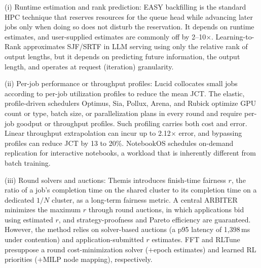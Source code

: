 \documentclass{ieeetj}
\begin{document}
(i) Runtime estimation and rank prediction: EASY backfilling\cite{mualem2001backfilling} is the standard HPC technique that reserves resources for the queue head while advancing later jobs only when doing so does not disturb the reservation. It depends on runtime estimates, and user-supplied estimates are commonly off by 2–10$\times$. Learning-to-Rank\cite{fu2024efficient} approximates SJF/SRTF in LLM serving using only the relative rank of output lengths, but it depends on predicting future information, the output length, and operates at request (iteration) granularity.

(ii) Per-job performance or throughput profiles: Lucid\cite{b5} collocates small jobs according to per-job utilization profiles to reduce the mean JCT. The elastic, profile-driven schedulers Optimus\cite{peng2018optimus}, Sia\cite{b4}, Pollux\cite{qiao2021pollux}, Arena\cite{arena2026}, and Rubick\cite{rubick2025} optimize GPU count or type, batch size, or parallelization plans in every round and require per-job goodput or throughput profiles. Such profiling carries both cost and error. Linear throughput extrapolation can incur up to 2.12$\times$ error, and bypassing profiles can reduce JCT by 13 to 20\%\cite{schedmate2025}. NotebookOS\cite{notebookos2026} schedules on-demand replication for interactive notebooks, a workload that is inherently different from batch training.

(iii) Round solvers and auctions: Themis\cite{mahajan2020themis} introduces finish-time fairness $r$, the ratio of a job's completion time on the shared cluster to its completion time on a dedicated $1/N$ cluster, as a long-term fairness metric. A central ARBITER minimizes the maximum $r$ through round auctions, in which applications bid using estimated $r$, and strategy-proofness and Pareto efficiency are guaranteed. However, the method relies on solver-based auctions (a p95 latency of 1,398\,ms under contention) and application-submitted $r$ estimates. FFT\cite{fft2025} and RLTune\cite{rltune2025} presuppose a round cost-minimization solver ($+$epoch estimates) and learned RL priorities ($+$MILP node mapping), respectively.
\end{document}

